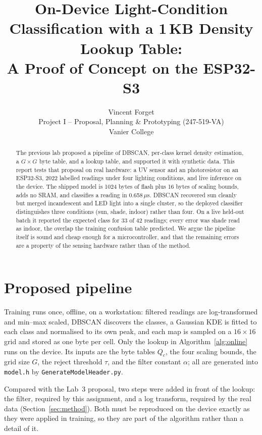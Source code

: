 \documentclass[10pt,a4paper,twocolumn]{article}
\title{On-Device Light-Condition Classification with a 1\,KB Density Lookup Table:\\
A Proof of Concept on the ESP32-S3}
\author{Vincent Forget\\Project I -- Proposal, Planning \& Prototyping (247-519-VA)\\Vanier College}
\date{\todo{Submission date}}
\begin{document}
\maketitle

\begin{abstract}
The previous lab proposed a pipeline of DBSCAN, per-class kernel density estimation,
a $G\times G$ byte table, and a lookup table, and supported it with synthetic data.
This report tests that proposal on real hardware: a UV sensor and an photoresistor on an
ESP32-S3, 2022 labelled readings under four lighting conditions, and live inference on
the device. The shipped model is 1024 bytes of flash plus 16 bytes of scaling bounds,
adds no SRAM, and classifies a reading in 0.658\,$\mu$s. DBSCAN recovered sun cleanly but
merged incandescent and LED light into a single cluster, so the deployed classifier
distinguishes three conditions (sun, shade, indoor) rather than four. On a live held-out
batch it reported the expected class for 33 of 42 readings; every error was shade read as
indoor, the overlap the training confusion table predicted. We argue the pipeline itself is
sound and cheap enough for a microcontroller, and that the remaining errors are a property
of the sensing hardware rather than of the method.
\end{abstract}

\section{Proposed pipeline}

Training runs once, offline, on a workstation: filtered readings are log-transformed and
min--max scaled, DBSCAN discovers the classes, a Gaussian KDE is fitted to each class and
normalised to its own peak, and each map is sampled on a $16\times16$ grid and stored as
one byte per cell. Only the lookup in Algorithm~\ref{alg:online} runs on the device. Its
inputs are the byte tables $Q_c$, the four scaling bounds, the grid size $G$, the reject
threshold $\tau$, and the filter constant $\alpha$; all are generated into
\texttt{model.h} by \texttt{GenerateModelHeader.py}.

Compared with the Lab~3 proposal, two steps were added in front of the lookup: the
filter, required by this assignment, and a log transform, required by the real data
(Section~\ref{sec:method}). Both must be reproduced on the device exactly as they were
applied in training, so they are part of the algorithm rather than a detail of it.
\end{document}
